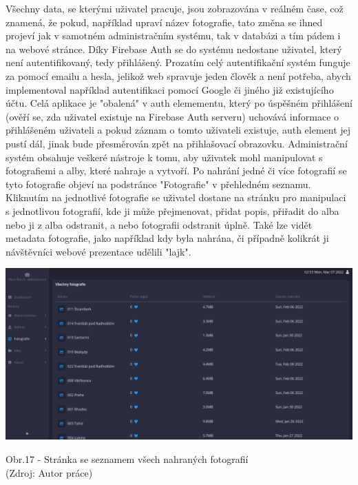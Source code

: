 \documentclass[12pt,a4paper]{report}
\begin{document}
  Všechny data, se kterými uživatel pracuje, jsou zobrazována v reálném čase, což znamená, že
  pokud, například upraví název fotografie, tato změna se ihned projeví jak v samotném
  administračním systému, tak v databázi a tím pádem i na webové stránce.
  Díky Firebase Auth se do systému nedostane uživatel, který není autentifikovaný, tedy přihlášený.
  Prozatím celý autentifikační systém funguje za pomocí emailu a hesla, jelikož web spravuje jeden
  člověk a není potřeba, abych implementoval například autentifikaci pomocí Google či jiného již
  existujícího účtu.
  Celá aplikace je "obalená" v auth elemementu, který po úspěšném přihlášení (ověří se, zda
  uživatel existuje na Firebase Auth serveru) uchovává informace o přihlášeném uživateli a pokud
  záznam o tomto uživateli existuje, auth element jej pustí dál, jinak bude přesměrován zpět na
  přihlašovací obrazovku.
  Administrační systém obsahuje veškeré nástroje k tomu, aby uživatek mohl manipulovat s
  fotografiemi a alby, které nahraje a vytvoří. Po nahrání jedné či více fotografií se tyto fotografie
  objeví na podstránce "Fotografie" v přehledném seznamu. Kliknutím na jednotlivé fotografie se
  uživatel dostane na stránku pro manipulaci s jednotlivou fotografií, kde ji může přejmenovat,
  přidat popis, přiřadit do alba nebo ji z alba odstranit, a nebo fotografii odstranit úplně. Také lze
  vidět metadata fotografie, jako například kdy byla nahrána, či případně kolikrát ji návštěvníci
  webové prezentace udělili "lajk".

  \vspace*{0.5cm}
  \noindent\includegraphics[width=\linewidth]{allPhotos.png}
  \begin{center}
    Obr.17 - Stránka se seznamem všech nahraných fotografií \\
    (Zdroj: Autor práce)
  \end{center}
  \vspace*{0.5cm}
\end{document}
